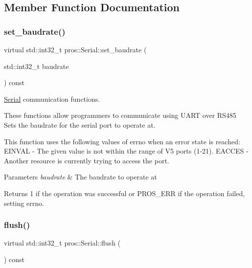\subsection{Member Function Documentation}
\mbox{\label{classpros_1_1Serial_ab8c6d804852e6689d6c92c6b2c439824}} 
\subsubsection{\texorpdfstring{set\+\_\+baudrate()}{set\_baudrate()}}
{\footnotesize\ttfamily virtual std\+::int32\+\_\+t pros\+::\+Serial\+::set\+\_\+baudrate (\begin{DoxyParamCaption}\item[{std\+::int32\+\_\+t}]{baudrate }\end{DoxyParamCaption}) const\hspace{0.3cm}{\ttfamily [virtual]}}



\hyperlink{classpros_1_1Serial}{Serial} communication functions. 

These functions allow programmers to communicate using U\+A\+RT over R\+S485 Sets the baudrate for the serial port to operate at.

This function uses the following values of errno when an error state is reached\+: E\+I\+N\+V\+AL -\/ The given value is not within the range of V5 ports (1-\/21). E\+A\+C\+C\+ES -\/ Another resource is currently trying to access the port.


\begin{DoxyParams}{Parameters}
{\em baudrate} & The baudrate to operate at\\
\hline
\end{DoxyParams}
\begin{DoxyReturn}{Returns}
1 if the operation was successful or P\+R\+O\+S\+\_\+\+E\+RR if the operation failed, setting errno. 
\end{DoxyReturn}
\mbox{\label{classpros_1_1Serial_a4d897c6f3f83636f4d4627ab02c10e76}} 
\subsubsection{\texorpdfstring{flush()}{flush()}}
{\footnotesize\ttfamily virtual std\+::int32\+\_\+t pros\+::\+Serial\+::flush (\begin{DoxyParamCaption}{ }\end{DoxyParamCaption}) const\hspace{0.3cm}{\ttfamily [virtual]}}



